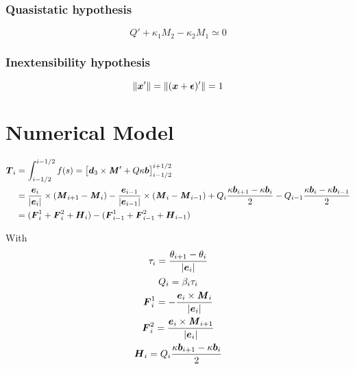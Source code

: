 \subsubsection{Quasistatic hypothesis}
\begin{equation}
	Q' + \kappa_1 M_2 - \kappa_2 M_1 \simeq 0
\end{equation}
\subsubsection{Inextensibility hypothesis}
\begin{equation}
	\|\boldsymbol{x}'\| = \|(\boldsymbol{x} + \boldsymbol{\epsilon})'\| = 1
\end{equation}

\section{Numerical Model}

\begin{equation}
	\begin{aligned}
	\boldsymbol{T}_i 
	&= \int_{i-1/2}^{i-1/2} f(s)  = \left[
	\boldsymbol{d}_3 \times \boldsymbol{\mathit{M}}'
	+ Q\kappa\boldsymbol{b}
	\right]_{i-1/2}^{i+1/2} \\
	&= 	\frac{\boldsymbol{e}_i}{|\boldsymbol{e}_i|} \times (\boldsymbol{\mathit{M}}_{i+1} - \boldsymbol{\mathit{M}}_{i})
		- \frac{\boldsymbol{e}_{i-1}}{|\boldsymbol{e}_{i-1}|} \times (\boldsymbol{\mathit{M}}_{i} - \boldsymbol{\mathit{M}}_{i-1}) 
		+ Q_i\frac{\kappa\boldsymbol{b}_{i+1}-\kappa\boldsymbol{b}_i}{2}
		- Q_{i-1}\frac{\kappa\boldsymbol{b}_{i}-\kappa\boldsymbol{b}_{i-1}}{2}\\
	&= (\boldsymbol{F}^1_{i} + \boldsymbol{F}^2_{i} + \boldsymbol{H}_{i}) - (\boldsymbol{F}^1_{i-1} + \boldsymbol{F}^2_{i-1} +  \boldsymbol{H}_{i-1})
	\end{aligned}
\end{equation}

With
\begin{subequations}
	\begin{gather}
	\tau_i		= \frac{\theta_{i+1} - \theta_i}{|\boldsymbol{e}_i|} \\
	Q_i 			= \beta_i \tau_i \\
	\boldsymbol{F}^1_{i} 	= - \frac{\boldsymbol{e}_i \times \boldsymbol{\mathit{M}}_i}{|\boldsymbol{e}_i|} \\
	\boldsymbol{F}^2_{i} 	=	\frac{\boldsymbol{e}_i \times \boldsymbol{\mathit{M}}_{i+1}}{|\boldsymbol{e}_i|} \\
	\boldsymbol{H}_{i} 	= Q_i\frac{\kappa\boldsymbol{b}_{i+1}-\kappa\boldsymbol{b}_i}{2} 
	\end{gather}
\end{subequations}


